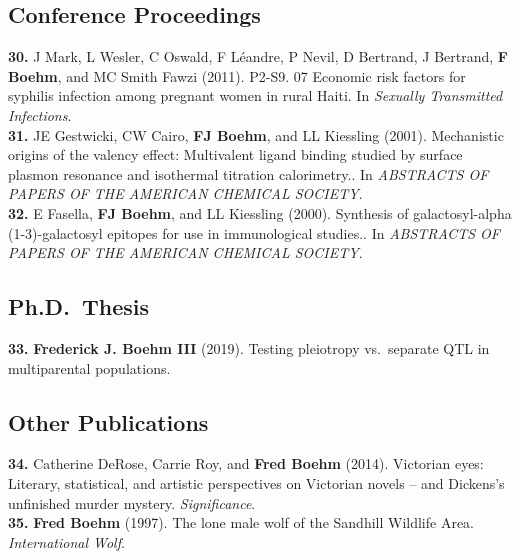 \documentclass[
  10pt,
]
{article}
\begin{document}
\subsection{Conference Proceedings}\label{conference-proceedings}

\textbf{30.} \normalsize \normalsize J Mark\normalsize , \normalsize L
Wesler\normalsize , \normalsize C Oswald\normalsize , \normalsize F
Léandre\normalsize , \normalsize P Nevil\normalsize , \normalsize D
Bertrand\normalsize , \normalsize J Bertrand\normalsize ,
\textbf{\normalsize F Boehm}\normalsize , and \normalsize MC Smith Fawzi
(2011). P2-S9. 07 Economic risk factors for syphilis infection among
pregnant women in rural Haiti. In \emph{Sexually Transmitted
Infections}.\\
\textbf{31.} \normalsize \normalsize JE Gestwicki\normalsize ,
\normalsize CW Cairo\normalsize ,
\textbf{\normalsize FJ Boehm}\normalsize , and \normalsize LL Kiessling
(2001). Mechanistic origins of the valency effect: Multivalent ligand
binding studied by surface plasmon resonance and isothermal titration
calorimetry.. In \emph{ABSTRACTS OF PAPERS OF THE AMERICAN CHEMICAL
SOCIETY}.\\
\textbf{32.} \normalsize \normalsize E Fasella\normalsize ,
\textbf{\normalsize FJ Boehm}\normalsize , and \normalsize LL Kiessling
(2000). Synthesis of galactosyl-alpha (1-3)-galactosyl epitopes for use
in immunological studies.. In \emph{ABSTRACTS OF PAPERS OF THE AMERICAN
CHEMICAL SOCIETY}.

\subsection{Ph.D.~Thesis}\label{ph.d.-thesis}

\textbf{33.} \normalsize \textbf{\normalsize Frederick J. Boehm III}
(2019). Testing pleiotropy vs.~separate QTL in multiparental
populations.

\subsection{Other Publications}\label{other-publications}

\textbf{34.} \normalsize \normalsize Catherine DeRose\normalsize ,
\normalsize Carrie Roy\normalsize , and \textbf{\normalsize Fred Boehm}
(2014). Victorian eyes: Literary, statistical, and artistic perspectives
on Victorian novels -- and Dickens's unfinished murder mystery.
\emph{Significance}.\\
\textbf{35.} \normalsize \textbf{\normalsize Fred Boehm} (1997). The
lone male wolf of the Sandhill Wildlife Area. \emph{International Wolf}.
\end{document}
